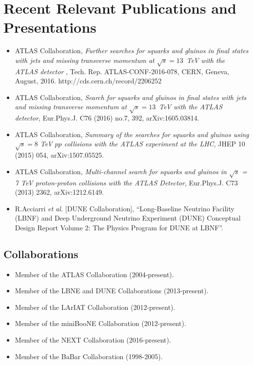 \section*{Recent Relevant Publications and Presentations }
\begin{itemize}

\item ATLAS Collaboration, \emph{Further searches for squarks and gluinos in final states with jets and missing transverse momentum at $\sqrt{s}=13$~TeV with the ATLAS detector }, Tech. Rep. ATLAS-CONF-2016-078, CERN, Geneva, August, 2016. http://cds.cern.ch/record/2206252

\item ATLAS Collaboration, \emph{Search for squarks and gluinos in final states with jets and missing transverse momentum at $\sqrt{s}= 13$~TeV with the ATLAS detector}, Eur.Phys.J. C76 (2016) no.7, 392, arXiv:1605.03814.

\item ATLAS Collaboration, \emph{Summary of the searches for squarks and gluinos using $\sqrt{s} = 8$ TeV $pp$ collisions with the ATLAS experiment at the LHC}, JHEP 10 (2015) 054, arXiv:1507.05525.

\item ATLAS Collaboration, \emph{Multi-channel search for squarks and gluinos in $\sqrt{s}$ = 7 TeV proton-proton collisions with the ATLAS Detector}, Eur.Phys.J. C73 (2013) 2362, arXiv:1212.6149.

\item
 R.Acciarri {\it et al.} [DUNE Collaboration], ``Long-Baseline
 Neutrino Facility (LBNF) and Deep Underground Neutrino Experiment
 (DUNE) Conceptual Design Report Volume 2: The Physics Program for
 DUNE at LBNF''. 

\end{itemize}
\subsection*{Collaborations}
\begin{itemize}
\item Member of the ATLAS Collaboration (2004-present). 
\item Member of the LBNE and DUNE Collaborations (2013-present). 
\item Member of the LArIAT Collaboration (2012-present). 
\item Member of the miniBooNE Collaboration (2012-present). 
\item Member of the NEXT Collaboration (2016-present). 
\item Member of the BaBar Collaboration (1998-2005). 
\end{itemize}

